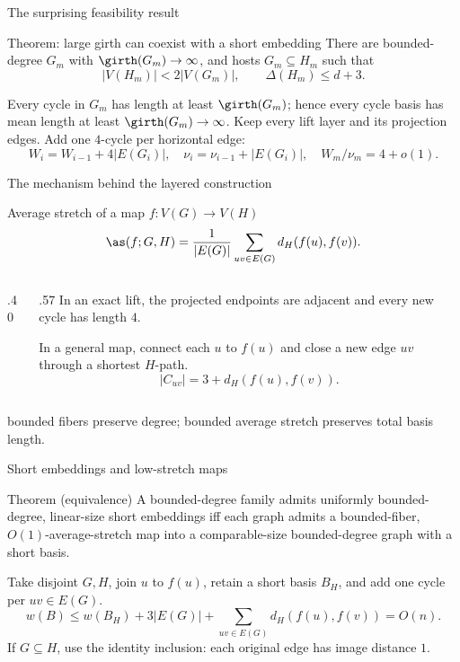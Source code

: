 \begin{frame}{The surprising feasibility result}
 \begin{block}{Theorem: large girth can coexist with a short embedding}
 There are bounded-degree $G_m$ with $\girth(G_m)\to\infty$, and hosts $G_m\subseteq H_m$ such that
 \[|V(H_m)|<2|V(G_m)|,\qquad\Delta(H_m)\le d+3.\]
 \end{block}
  Every cycle in $G_m$ has length at least $\girth(G_m)$; hence every cycle basis has mean length at least $\girth(G_m)\to\infty$.
 \vspace{.13cm}
  Keep every lift layer and its projection edges. Add one $4$-cycle per horizontal edge:
 \[W_i=W_{i-1}+4|E(G_i)|,\quad \nu_i=\nu_{i-1}+|E(G_i)|,\quad W_m/\nu_m=4+o(1).\]
\end{frame}


\begin{frame}{The mechanism behind the layered construction}
 \begin{block}{Average stretch of a map $f:V(G)\to V(H)$}
 \[\as(f;G,H)=\frac1{|E(G)|}\sum_{uv\in E(G)}d_H(f(u),f(v)).\]
 \end{block}
 \begin{columns}[c,onlytextwidth]
  \begin{column}{.40\textwidth}
   \centering\resizebox{.53\linewidth}{!}{\LiftSquareFig}
  \end{column}
  \begin{column}{.57\textwidth}
   In an exact lift, the projected endpoints are adjacent and every new cycle has length $4$.

   In a general map, connect each $u$ to $f(u)$ and close a new edge $uv$ through a shortest $H$-path.
   \[\boxed{|C_{uv}|=3+d_H(f(u),f(v))}.\]
  \end{column}
 \end{columns}
 \small{} bounded fibers preserve degree; bounded average stretch preserves total basis length.
\end{frame}


\begin{frame}{Short embeddings and low-stretch maps}
 \begin{block}{Theorem (equivalence)}
 A bounded-degree family admits uniformly bounded-degree, linear-size short embeddings iff each graph admits a bounded-fiber, \(O(1)\)-average-stretch map into a comparable-size bounded-degree graph with a short basis.
 \end{block}
  Take disjoint \(G,H\), join \(u\) to \(f(u)\), retain a short basis \(B_H\), and add one cycle per \(uv\in E(G)\).
 \[ w(B)\le w(B_H)+3|E(G)|+\sum_{uv\in E(G)}d_H(f(u),f(v))=O(n). \]
  If \(G\subseteq H\), use the identity inclusion: each original edge has image distance \(1\).
\end{frame}


